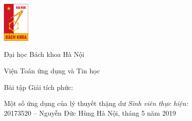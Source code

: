 \begin{titlepage}
	\parbox{4.6em}{
		\includegraphics[width=3.6em]{resources/bk.jpg}
	}
	\parbox{\textwidth-4.5em}{
		{\huge Đại học Bách khoa Hà Nội\par}
		{\Large Viện Toán ứng dụng và Tin học}
	}
	\vfill
	\begin{center}
		{\Large Bài tập Giải tích phức:}\par
		{\LARGE Một số ứng dụng của lý thuyết thặng dư}
		\vfill
		\textit{Sinh viên thực hiện:}\\
		20173520 -- Nguyễn Đức Hùng
		\vfill
		Hà Nội, tháng 5 năm 2019
	\end{center}
\end{titlepage}

